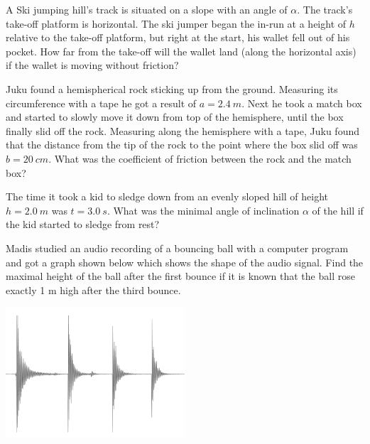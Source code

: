 \documentclass[11pt]{article}
\begin{document}
\probeng
A Ski jumping hill’s track is situated on a slope with an angle of $\alpha$. The track’s take-off platform is horizontal. The ski jumper began the in-run at a height of $h$ relative to the take-off platform, but right at the start, his wallet fell out of his pocket. How far from the take-off will the wallet land (along the horizontal axis) if the wallet is moving without friction?
\probend
\bigskip


\probeng
Juku found a hemispherical rock sticking up from the ground. Measuring its circumference with a tape he got a result of $a=\SI{2,4}{m}$. Next he took a match box and started to slowly move it down from top of the hemisphere, until the box finally slid off the rock. Measuring along the hemisphere with a tape, Juku found that the distance from the tip of the rock to the point where the box slid off was $b=\SI{20}{cm}$. What was the coefficient of friction between the rock and the match box?
\probend
\bigskip


\probeng
The time it took a kid to sledge down from an evenly sloped hill of height $h=\SI{2,0}{m}$ was $t=\SI{3,0}{s}$. What was the minimal angle of inclination $\alpha$ of the hill if the kid started to sledge from rest?
\probend
\bigskip


\probeng
Madis studied an audio recording of a bouncing ball with a computer program and got a graph shown below which shows the shape of the audio signal. Find the maximal height of the ball after the first bounce if it is known that the ball rose exactly 1 m high after the third bounce.
\begin{center}
\includegraphics[width=0.5\textwidth]{2013-v3g-02-pall}%
\end{center}
\probend
\bigskip
\end{document}
